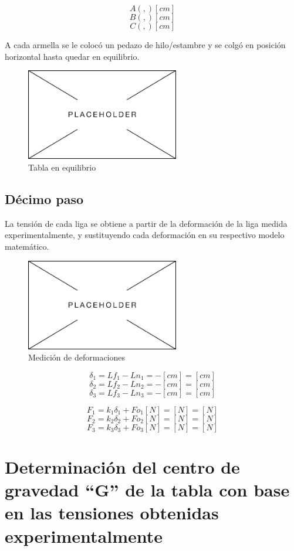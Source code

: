 \documentclass[12pt, titlepage]{report}
\begin{document}
    $$A(,) [cm]$$
    $$B(,) [cm]$$
    $$C(,) [cm]$$

    A cada armella se le colocó un pedazo de hilo/estambre y se colgó en posición horizontal hasta quedar en equilibrio.

    \begin{figure}[ht]
        \centering
        \includegraphics[height=4cm]{Placeholder.png}
        \caption{Tabla en equilibrio}
    \end{figure}

    \subsection*{Décimo paso}
    La tensión de cada liga se obtiene a partir de la deformación de la liga medida experimentalmente, y sustituyendo cada deformación en su respectivo modelo matemático. 

    \begin{figure}[ht]
        \centering
        \includegraphics[height=4cm]{Placeholder.png}
        \caption{Medición de deformaciones}
    \end{figure}

    $$\delta_{1}=Lf_{1}-Ln_{1}= - [cm] = [cm]$$
    $$\delta_{2}=Lf_{2}-Ln_{2}= - [cm] = [cm]$$
    $$\delta_{3}=Lf_{3}-Ln_{3}= - [cm] = [cm]$$

    $$F_{1}=k_{1}\delta_{1}+Fo_{1} [N] =  [N] = [N]$$
    $$F_{2}=k_{2}\delta_{2}+Fo_{2} [N] =  [N] = [N]$$
    $$F_{3}=k_{3}\delta_{3}+Fo_{3} [N] =  [N] = [N]$$

    \hfill
    \section{Determinación del centro de gravedad ``G'' de la tabla con base en las tensiones obtenidas experimentalmente}
\end{document}
